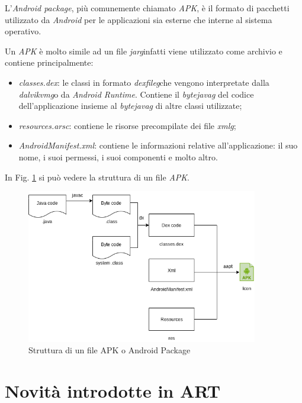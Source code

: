 L'\emph{Android package}, più comunemente chiamato \emph{APK}, è il formato di pacchetti utilizzato da \emph{Android} per le applicazioni sia esterne che interne al sistema operativo.

Un \emph{APK} è molto simile ad un file \emph{\gls{jarg}}\glsfirstoccurspace infatti viene utilizzato come archivio e contiene principalmente:
\begin{itemize}
    \item \emph{classes.dex}: le classi in formato \emph{\gls{dexfileg}}\glsfirstoccurspace che vengono interpretate dalla \emph{\gls{dalvikvmg}}\glsfirstoccurspace o da \emph{Android Runtime}. Contiene il \emph{\gls{bytejavag}} del codice dell'applicazione insieme al \emph{\gls{bytejavag}} di altre classi utilizzate;
    \item \emph{resources.arsc}: contiene le risorse precompilate dei file \emph{\gls{xmlg}}\glsfirstoccur;
    \item \emph{AndroidManifest.xml}: contiene le informazioni relative all'applicazione: il suo nome, i suoi permessi, i suoi componenti e molto altro.
\end{itemize}
In Fig. \ref{fig:apk_structure} si può vedere la struttura di un file \emph{APK}.

\begin{figure} [H]
\center
\includegraphics[width=0.9\textwidth]{figures/apk_structure}
\caption[Struttura di un file APK o Android Package]{Struttura di un file APK o Android Package
\label{fig:apk_structure}}
\end{figure}

\newpage

\section{Novità introdotte in ART}
\label{sec:nov_art}

